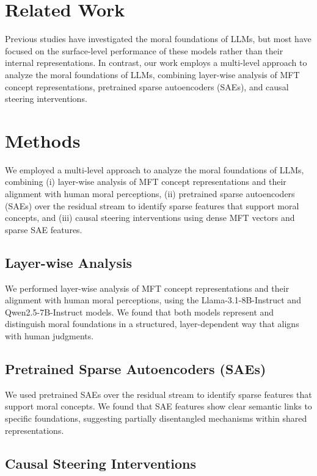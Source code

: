 \documentclass{article}
\begin{document}
\section{Related Work}

Previous studies have investigated the moral foundations of LLMs, but most have focused on the surface-level performance of these models rather than their internal representations. In contrast, our work employs a multi-level approach to analyze the moral foundations of LLMs, combining layer-wise analysis of MFT concept representations, pretrained sparse autoencoders (SAEs), and causal steering interventions.

\section{Methods}

We employed a multi-level approach to analyze the moral foundations of LLMs, combining (i) layer-wise analysis of MFT concept representations and their alignment with human moral perceptions, (ii) pretrained sparse autoencoders (SAEs) over the residual stream to identify sparse features that support moral concepts, and (iii) causal steering interventions using dense MFT vectors and sparse SAE features.

\subsection{Layer-wise Analysis}

We performed layer-wise analysis of MFT concept representations and their alignment with human moral perceptions, using the Llama-3.1-8B-Instruct and Qwen2.5-7B-Instruct models. We found that both models represent and distinguish moral foundations in a structured, layer-dependent way that aligns with human judgments.

\subsection{Pretrained Sparse Autoencoders (SAEs)}

We used pretrained SAEs over the residual stream to identify sparse features that support moral concepts. We found that SAE features show clear semantic links to specific foundations, suggesting partially disentangled mechanisms within shared representations.

\subsection{Causal Steering Interventions}
\end{document}
